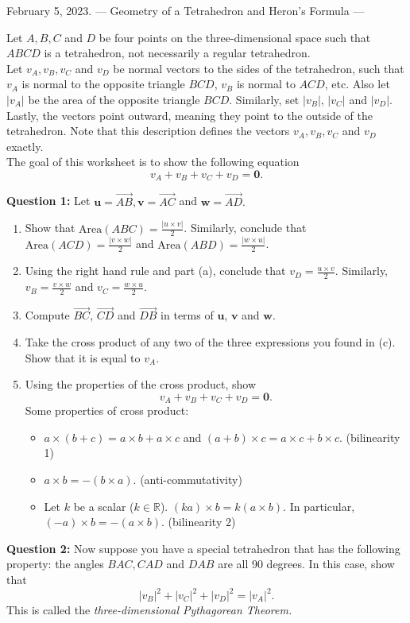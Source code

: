 February 5, 2023.
---
Geometry of a Tetrahedron and Heron's Formula
---

Let $A,B,C$ and $D$ be four points on the three-dimensional space such that $ABCD$ is a tetrahedron, not necessarily a regular tetrahedron. \\

Let  $v_A, v_B, v_C$ and $v_D$ be normal vectors to the sides of the tetrahedron, such that $v_A$ is normal to the opposite triangle $BCD$, $v_B$ is normal to $ACD$, etc. Also let $|v_A|$ be the area of the opposite triangle $BCD$. Similarly, set $|v_B|$, $|v_C|$ and $|v_D|$. Lastly, the vectors point outward, meaning they point to the outside of the tetrahedron. Note that this description defines the vectors $v_A, v_B, v_C$ and $v_D$ exactly.\\

The goal of this worksheet is to show the following equation $$v_A+v_B+v_C+v_D = \textbf{0}.$$

\textbf{Question 1:} Let $\textbf{u} = \overset{\rightarrow}{AB}, \textbf{v} = \overset{\rightarrow}{AC}$ and $\textbf{w} = \overset{\rightarrow}{AD}.$ 
\begin{enumerate}[label=(\alph*)]
    \item Show that $\textrm{Area}(ABC) = \frac{|u\times v|}{2}$. Similarly, conclude that $\textrm{Area}(ACD) = \frac{|v\times w|}{2}$ and $\textrm{Area}(ABD) = \frac{|w\times u|}{2}$.
    \item Using the right hand rule and part (a), conclude that $v_D = \frac{u\times v}{2}$. Similarly, $v_B = \frac{v\times w}{2}$ and $v_C = \frac{w\times u}{2}$.
    \item Compute $\overset{\rightarrow}{BC}$, $\overset{\rightarrow}{CD}$ and $\overset{\rightarrow}{DB}$ in terms of $\textbf{u}$, $\textbf{v}$ and $\textbf{w}$.
    \item Take the cross product of any two of the three expressions you found in (c). Show that it is equal to $v_A.$
    \item Using the properties of the cross product, show $$v_A + v_B + v_C + v_D = \textbf{0}.$$ Some properties of cross product:
    \begin{itemize}
        \item $a\times (b+c) = a\times b + a\times c$ and $(a+b) \times c = a\times c + b\times c.$ (bilinearity 1) 
        \item $a\times b = - (b\times a).$ (anti-commutativity)
        \item Let $k$ be a scalar ($k\in \mathbb{R}$). $(ka) \times b = k(a\times b).$ In particular, $(-a)\times b = -(a\times b).$ (bilinearity 2)
    \end{itemize}
\end{enumerate}

\textbf{Question 2:} Now suppose you have a special tetrahedron that has the following property: the angles $BAC, CAD$ and $DAB$ are all 90 degrees. In this case, show that $$|v_B|^2+|v_C|^2+|v_D|^2 = |v_A|^2.$$ This is called the \textit{three-dimensional Pythagorean Theorem.}